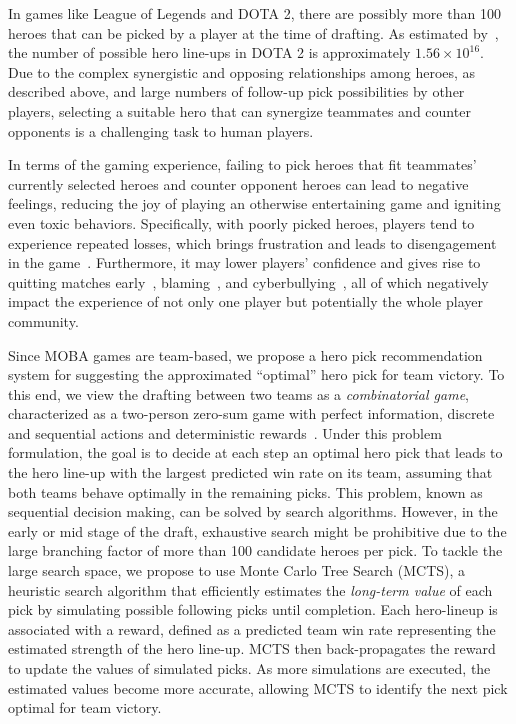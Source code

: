 In games like League of Legends and DOTA 2, there are possibly more than 100 heroes that can be picked by a player at the time of drafting. As estimated by~\cite{hanke2017reco}, the number of possible hero line-ups in DOTA 2 is approximately $1.56 \times 10^{16}$. Due to the complex synergistic and opposing relationships among heroes, as described above, and large numbers of follow-up pick possibilities by other players, selecting a suitable hero that can synergize teammates and counter opponents is a challenging task to human players. 


In terms of the gaming experience, failing to pick heroes that fit teammates' currently selected heroes and counter opponent heroes can lead to negative feelings, reducing the joy of playing an otherwise entertaining game and igniting even toxic behaviors. Specifically, with poorly picked heroes, players tend to experience repeated losses, which brings frustration and leads to disengagement in the game~\cite{schoenau2011player,yee2006motivations,sherry2006video, chen2015analytics}. Furthermore, it may lower players' confidence and gives rise to quitting matches early~\cite{shores2014identification}, blaming~\cite{kou2013regulating}, and  cyberbullying~\cite{kwak2015exploring}, all of which negatively impact the experience of not only one player but potentially the whole player community.

Since MOBA games are team-based, we propose a hero pick recommendation system for suggesting the approximated ``optimal'' hero pick for team victory. To this end, we view the drafting between two teams as a \textit{combinatorial game}, characterized as a two-person zero-sum game with perfect information, discrete and sequential actions and deterministic rewards~\cite{browne2012survey}. Under this problem formulation, the goal is to decide at each step an optimal hero pick that leads to the hero line-up with the largest predicted win rate on its team, assuming that both teams behave optimally in the remaining picks. This problem, known as sequential decision making, can be solved by search algorithms. However, in the early or mid stage of the draft, exhaustive search might be prohibitive due to the large branching factor of more than 100 candidate heroes per pick. To tackle the large search space, we propose to use Monte Carlo Tree Search (MCTS), a heuristic search algorithm that efficiently estimates the \textit{long-term value} of each pick by simulating possible following picks until completion. Each hero-lineup is associated with a reward, defined as a predicted team win rate representing the estimated strength of the hero line-up. MCTS then back-propagates the reward to update the values of simulated picks. As more simulations are executed, the estimated values become more accurate, allowing MCTS to identify the next pick optimal for team victory. 


